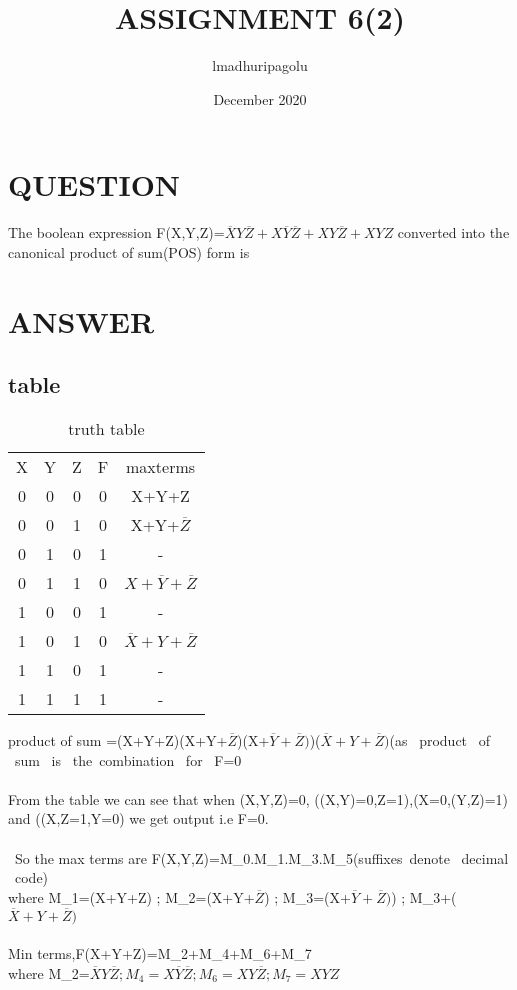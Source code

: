 \documentclass{article}
\title{ASSIGNMENT   6(2)}
\author{lmadhuripagolu }
\date{December 2020}
\begin{document}
\maketitle

\section{QUESTION}
The boolean expression F(X,Y,Z)=$\overline{X}Y\overline{Z}+X\overline{Y}\overline{Z}+XY\overline{Z}+XYZ$ converted into the canonical product of sum(POS) form is
\section{ANSWER}
\subsection{table}
\begin{table}[ht]
\begin{tabular}{|c|c|c|c|c|}
\hline
X & Y & Z & F & maxterms\\

0 & 0 & 0 & 0 & X+Y+Z \\

0 & 0 & 1 & 0 & X+Y+$\overline{Z}$\\

0 & 1 & 0 & 1 & -\\

0 & 1 & 1 & 0 & $X+\overline{Y}+\overline{Z}$ \\

1 & 0 & 0 & 1 & -\\

1 & 0 & 1 & 0 & $\overline{X}+Y+\overline{Z}$\\

1 & 1 & 0 & 1 & -\\

1 & 1 & 1 & 1 & -\\
\hline
\end{tabular}
    \caption{truth table}
    \label{tab:my_label}
\end{table}


product of sum =(X+Y+Z)(X+Y+$\overline{Z}$)(X+$\overline{Y}+\overline{Z})$)($\overline{X}+Y+\overline{Z})$(as \ product \ of \ sum \ is \ the\ combination \ for \ F=0 \\\\
From the table we can see that when (X,Y,Z)=0, ((X,Y)=0,Z=1),(X=0,(Y,Z)=1) and ((X,Z=1,Y=0) we get output i.e F=0.\\\\\
So the max terms are F(X,Y,Z)=M_0.M_1.M_3.M_5(suffixes\ denote \ decimal \ code)\\
where M_1=(X+Y+Z) ; M_2=(X+Y+$\overline{Z}$) ; M_3=(X+$\overline{Y}+\overline{Z})$) ; M_3+($\overline{X}+Y+\overline{Z})$\\\\
Min terms,F(X+Y+Z)=M_2+M_4+M_6+M_7\\
where M_2=$\overline{X}Y\overline{Z} ; M_4=X\overline{Y}\overline{Z} ; M_6=XY\overline{Z} ; M_7=XYZ$
\end{document}
